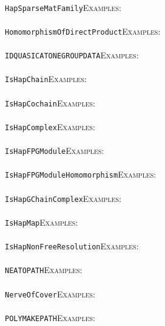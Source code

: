 \documentclass[a4paper,11pt]{report}
\begin{document}
{{ \\
 \texttt{HapSparseMatFamily}{\nobreakspace}{\nobreakspace}{\nobreakspace}{\nobreakspace}\textsc{Examples:} \\
 \\
 \texttt{HomomorphismOfDirectProduct}{\nobreakspace}{\nobreakspace}{\nobreakspace}{\nobreakspace}\textsc{Examples:} \\
 \\
 \texttt{IDQUASICATONEGROUP{\textunderscore}DATA}{\nobreakspace}{\nobreakspace}{\nobreakspace}{\nobreakspace}\textsc{Examples:} \\
 \\
 \texttt{IsHapChain}{\nobreakspace}{\nobreakspace}{\nobreakspace}{\nobreakspace}\textsc{Examples:} \\
 \\
 \texttt{IsHapCochain}{\nobreakspace}{\nobreakspace}{\nobreakspace}{\nobreakspace}\textsc{Examples:} \\
 \\
 \texttt{IsHapComplex}{\nobreakspace}{\nobreakspace}{\nobreakspace}{\nobreakspace}\textsc{Examples:} \\
 \\
 \texttt{IsHapFPGModule}{\nobreakspace}{\nobreakspace}{\nobreakspace}{\nobreakspace}\textsc{Examples:} \\
 \\
 \texttt{IsHapFPGModuleHomomorphism}{\nobreakspace}{\nobreakspace}{\nobreakspace}{\nobreakspace}\textsc{Examples:} \\
 \\
 \texttt{IsHapGChainComplex}{\nobreakspace}{\nobreakspace}{\nobreakspace}{\nobreakspace}\textsc{Examples:} \\
 \\
 \texttt{IsHapMap}{\nobreakspace}{\nobreakspace}{\nobreakspace}{\nobreakspace}\textsc{Examples:} \\
 \\
 \texttt{IsHapNonFreeResolution}{\nobreakspace}{\nobreakspace}{\nobreakspace}{\nobreakspace}\textsc{Examples:} \\
 \\
 \texttt{NEATO{\textunderscore}PATH}{\nobreakspace}{\nobreakspace}{\nobreakspace}{\nobreakspace}\textsc{Examples:} \\
 \\
 \texttt{NerveOfCover}{\nobreakspace}{\nobreakspace}{\nobreakspace}{\nobreakspace}\textsc{Examples:} \\
 \\
 \texttt{POLYMAKE{\textunderscore}PATH}{\nobreakspace}{\nobreakspace}{\nobreakspace}{\nobreakspace}\textsc{Examples:} \\
}}
\end{document}

